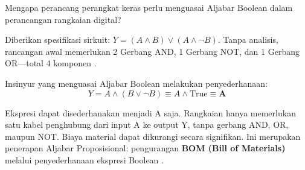 Mengapa perancang perangkat keras perlu menguasai Aljabar Boolean dalam perancangan rangkaian digital?

Diberikan spesifikasi sirkuit: \textbf{$Y = (A \land B) \lor (A \land \neg B)$}. Tanpa analisis, rancangan awal memerlukan 2 Gerbang AND, 1 Gerbang NOT, dan 1 Gerbang OR---total 4 komponen \cite{levin_discrete}.

Insinyur yang menguasai Aljabar Boolean melakukan penyederhanaan:
$$ Y = A \land (B \lor \neg B) \equiv A \land \text{True} \equiv \textbf{A} $$

Ekspresi dapat disederhanakan menjadi A saja. Rangkaian hanya memerlukan satu kabel penghubung dari input A ke output Y, tanpa gerbang AND, OR, maupun NOT. Biaya material dapat dikurangi secara signifikan.
Ini merupakan penerapan Aljabar Proposisional: pengurangan \textbf{BOM (Bill of Materials)} melalui penyederhanaan ekspresi Boolean \cite{grinnell_logic,hackatronic}.
